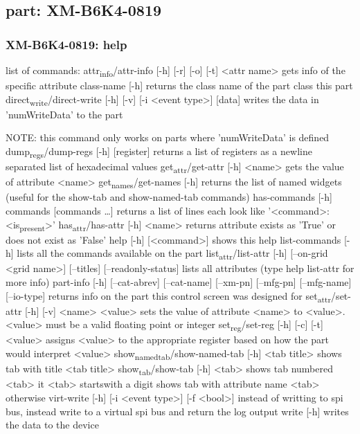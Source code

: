 \documentclass[11pt]{article}
\begin{document}
\subsection{part: XM-B6K4-0819}
\label{sec:org51a0528}
\subsubsection{XM-B6K4-0819: help}
\label{sec:org9fee470}
list of commands:
  attr\textsubscript{info}/attr-info [-h] [-r] [-o] [-t] <attr name>
    gets info of the specific attribute
  class-name [-h]
    returns the class name of the part class this part
  direct\textsubscript{write}/direct-write [-h] [-v] [-i <event type>] [data]
    writes the data in 'numWriteData' to the part

  NOTE: this command only works on parts where 'numWriteData' is defined
dump\textsubscript{regs}/dump-regs [-h] [register]
  returns a list of registers as a newline separated list of hexadecimal values
get\textsubscript{attr}/get-attr [-h] <name>
  gets the value of attribute <name>
get\textsubscript{names}/get-names [-h]
  returns the list of named widgets (useful for the show-tab and show-named-tab commands)
has-commands [-h] commands [commands \ldots{}]
  returns a list of lines each look like '<command>: <is\textsubscript{present}>'
has\textsubscript{attr}/has-attr [-h] <name>
  returns attribute exists as 'True' or does not exist as 'False'
help [-h] [<command>]
  shows this help
list-commands [-h]
  lists all the commands available on the part
list\textsubscript{attr}/list-attr [-h] [--on-grid <grid name>] [--titles] [--readonly-status]
  lists all attributes (type help list-attr for more info)
part-info  [-h] [--cat-abrev] [--cat-name] [--xm-pn] [--mfg-pn] [--mfg-name]
	[--io-type]
  returns info on the part this control screen was designed for
set\textsubscript{attr}/set-attr [-h] [-v] <name> <value>
  sets the value of attribute <name> to <value>.
  <value> must be a valid floating point or integer
set\textsubscript{reg}/set-reg [-h] [-c] [-t] <value>
  assigns <value> to the appropriate register based on how the part would interpret <value>
show\textsubscript{named}\textsubscript{tab}/show-named-tab [-h] <tab title>
  shows tab with title <tab title>
show\textsubscript{tab}/show-tab [-h] <tab>
  shows tab numbered <tab> it <tab> startswith a digit
  shows tab with attribute name <tab> otherwise
virt-write [-h] [-i <event type>] [-f <bool>]
  instead of writting to spi bus, instead write to a virtual spi bus
  and return the log output
write [-h]
  writes the data to the device
\end{document}
